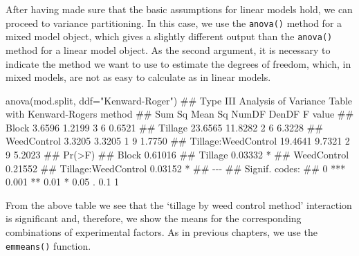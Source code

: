 \documentclass[a4paper,12pt,oneside]{book}
\newenvironment{Shaded}{\begin{snugshade}}{\end{snugshade}}
\newcommand{\StringTok}[1]{#1}
\newcommand{\DocumentationTok}[1]{#1}
\newcommand{\FunctionTok}[1]{#1}
\newcommand{\AttributeTok}[1]{#1}
\newcommand{\NormalTok}[1]{#1}
\begin{document}
After having made sure that the basic assumptions for linear models hold, we can proceed to variance partitioning. In this case, we use the \texttt{anova()} method for a mixed model object, which gives a slightly different output than the \texttt{anova()} method for a linear model object. As the second argument, it is necessary to indicate the method we want to use to estimate the degrees of freedom, which, in mixed models, are not as easy to calculate as in linear models.

\begin{Shaded}
\begin{Highlighting}[]
\FunctionTok{anova}\NormalTok{(mod.split, }\AttributeTok{ddf=}\StringTok{"Kenward{-}Roger"}\NormalTok{)}
\DocumentationTok{\#\# Type III Analysis of Variance Table with Kenward{-}Roger\textquotesingle{}s method}
\DocumentationTok{\#\#                      Sum Sq Mean Sq NumDF DenDF F value}
\DocumentationTok{\#\# Block                3.6596  1.2199     3     6  0.6521}
\DocumentationTok{\#\# Tillage             23.6565 11.8282     2     6  6.3228}
\DocumentationTok{\#\# WeedControl          3.3205  3.3205     1     9  1.7750}
\DocumentationTok{\#\# Tillage:WeedControl 19.4641  9.7321     2     9  5.2023}
\DocumentationTok{\#\#                      Pr(\textgreater{}F)  }
\DocumentationTok{\#\# Block               0.61016  }
\DocumentationTok{\#\# Tillage             0.03332 *}
\DocumentationTok{\#\# WeedControl         0.21552  }
\DocumentationTok{\#\# Tillage:WeedControl 0.03152 *}
\DocumentationTok{\#\# {-}{-}{-}}
\DocumentationTok{\#\# Signif. codes:  }
\DocumentationTok{\#\# 0 \textquotesingle{}***\textquotesingle{} 0.001 \textquotesingle{}**\textquotesingle{} 0.01 \textquotesingle{}*\textquotesingle{} 0.05 \textquotesingle{}.\textquotesingle{} 0.1 \textquotesingle{} \textquotesingle{} 1}
\end{Highlighting}
\end{Shaded}

From the above table we see that the `tillage by weed control method' interaction is significant and, therefore, we show the means for the corresponding combinations of experimental factors. As in previous chapters, we use the \texttt{emmeans()} function.
\end{document}
